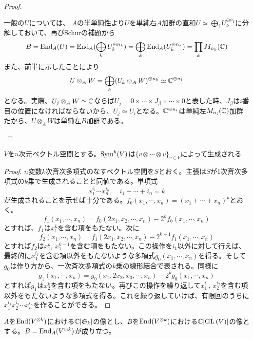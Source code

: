 \documentclass{ltjsreport}
\begin{document}
\begin{proof}
\begin{enumerate}
      一般の$U$については、
      $A$の半単純性より$U$を単純右$A$加群の直和$U\simeq\bigoplus_iU_k^{\oplus n_k}$に分解しておいて、再びSchurの補題から
      \[
      B=\text{End}_A(U)=\text{End}_A(\bigoplus_kU_k^{\oplus n_k})=\bigoplus_k\text{End}_A(U_k^{\oplus n_k})=\prod_kM_{n_k}(\mathbb{C})
      \]
      また、前半に示したことにより
      \[
      U\otimes_AW=\bigoplus_k(U_k\otimes_AW)^{\oplus n_k}\simeq \mathbb{C}^{\oplus n_i}
      \]
      となる。実際、$U_j\otimes_AW\simeq \mathbb{C}$ならば$U_j=0\times\cdots\times J_\beta\times\cdots\times 0$と表した時、$J_\beta$は$i$番目の位置になければならないから、$U_j\simeq U_i$となる。$\mathbb{C}^{\oplus n_i}$は単純左$M_{n_i}(\mathbb{C})$加群だから、$U\otimes_AW$は単純左$B$加群である。
  \end{enumerate}
\end{proof}


\begin{lemm}\label{gen_of_symtensor}
  $V$を$n$次元ベクトル空間とする。$\text{Sym}^k(V)$は$\{v\otimes\cdots\otimes v\}_{v\in V}$によって生成される
\end{lemm}

\begin{proof}
  $n$変数$k$次斉次多項式のなすベクトル空間を$S$とおく。主張は$S$が1次斉次多項式の$k$乗で生成されることと同値である。単項式
  \[
  x_1^{i_1}\cdots x_n^{i_n},\quad i_1+\cdots+i_n=k
  \]
  が生成されることを示せば十分である。$f_0(x_1,\cdots,x_n)=(x_1+\cdots +x_n)^k$とおく。
  \[
  f_1(x_1,\cdots,x_n)=f_0(2x_1,x_2,\cdots,x_n)-2^{k}f_0(x_1,\cdots,x_n)  
  \]
  とすれば、$f_1$は$x_1^k$を含む項をもたない。次に
  \[
  f_2(x_1,\cdots,x_n)=f_1(2x_1,x_2,\cdots,x_n)-2^{k-1}f_1(x_1,\cdots,x_n)  
  \]
  とすれば$f_2$は$x_1^{k}$, $x_1^{k-1}$を含む項をもたない。この操作を$i_1$以外に対して行えば、最終的に$x_1^{i_1}$を含む項以外をもたないような多項式$g_0(x_1,\cdots,x_n)$を得る。そして$g_0$は作り方から、一次斉次多項式の$k$乗の線形結合で表される。同様に
  \[
  g_1(x_1,\cdots,x_n)=g_0(x_1,2x_2,x_3,\cdots,x_n)-2^{k}g_0(x_1,\cdots,x_n)  
  \]
  とすれば$g_1$は$x_2^k$を含む項をもたない。再びこの操作を繰り返して$x_1^{i_1}$, $x_2^{i_2}$を含む項以外をもたないような多項式を得る。これを繰り返していけば、有限回のうちに$x_1^{i_1}x_2^{i_2}\cdots x_n^{i_n}$を作ることができる。
\end{proof}


\begin{lemm}\label{lemma}
  $A$を$\text{End}(V^{\otimes k})$における$\mathbb{C}[\mathfrak{S}_k]$の像とし、$B$を$\text{End}(V^{\otimes k})$における$\mathbb{C}[\text{GL}\:(V)]$の像とする。$B=\text{End}_A(V^{\otimes k})$が成り立つ。
\end{lemm}
\end{document}
